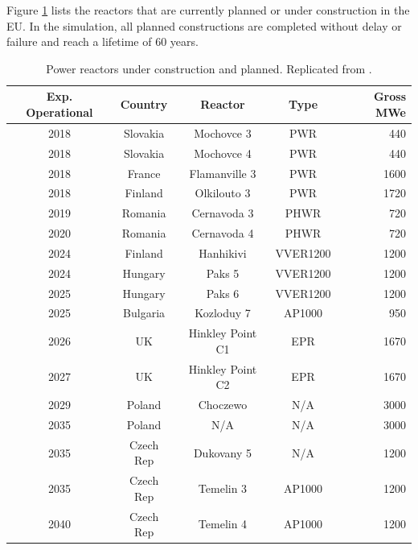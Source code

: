 Figure \ref{tab:eu_deployment} lists the reactors that are currently  planned or
under construction in the \gls{EU}. In the simulation, all  planned constructions are completed 
without delay or failure and reach a lifetime of 60 years.  

\pagebreak
\begin{table}[h]
    \centering
    \caption {Power reactors under construction and planned. Replicated from \cite{world_nuclear_association_nuclear_2017}.}
    \label{tab:eu_deployment}
    \begin{tabular}{ccccr}
        \hline
        \textbf{Exp. Operational }&\textbf{Country} &\textbf{Reactor} & \textbf{Type} & \textbf{Gross \gls{MWe}}\\
        \hline
        2018 & Slovakia  & Mochovce 3 & PWR & 440\\
        2018 & Slovakia & Mochovce 4 & PWR & 440 \\
        2018 & France & Flamanville 3 & PWR & 1600 \\
        2018 & Finland & Olkilouto 3 & PWR & 1720 \\
        2019 & Romania & Cernavoda 3 & PHWR & 720 \\
        2020 & Romania & Cernavoda 4 & PHWR & 720 \\
        2024 & Finland & Hanhikivi & VVER1200 & 1200 \\
        2024 & Hungary & Paks 5 & VVER1200 & 1200 \\
        2025 & Hungary & Paks 6 & VVER1200 & 1200 \\
        2025 & Bulgaria & Kozloduy 7 & \footnotemark AP1000 & 950 \\
        2026 & UK & Hinkley Point C1 & EPR & 1670 \\
        2027 & UK & Hinkley Point C2 & EPR & 1670 \\
        2029 & Poland & Choczewo & N/A & 3000 \\
        2035 & Poland & N/A & N/A & 3000 \\
        2035 & Czech Rep & Dukovany 5 & N/A & 1200 \\
        2035 & Czech Rep & Temelin 3 & AP1000 & 1200 \\
        2040 & Czech Rep & Temelin 4 & AP1000 & 1200 \\
        \hline
    \end{tabular}
\end{table}

\FloatBarrier

